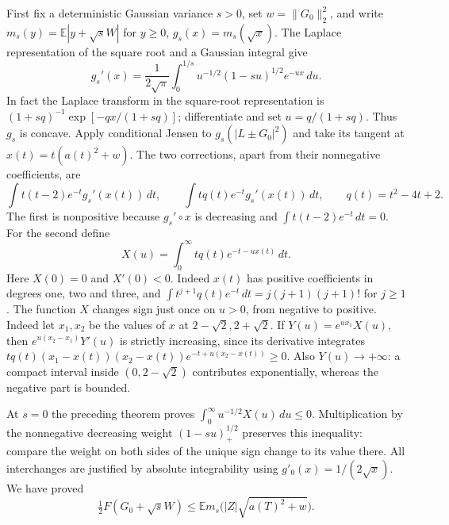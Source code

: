 \documentclass[11pt]{article}
\newcommand{\E}{\mathbb E}
\newcommand{\dd}{\,d}
\begin{document}
First fix a deterministic Gaussian variance \(s>0\), set \(w=\|G_0\|_2^2\), and write
\(m_s(y)=\E|y+\sqrt s W|\) for \(y\ge0\), \(g_s(x)=m_s(\sqrt x)\). The Laplace
representation of the square root and a Gaussian integral give
\[
 g_s'(x)=\frac1{2\sqrt\pi}\int_0^{1/s} u^{-1/2}(1-su)^{1/2} e^{-ux}\dd u.       \tag{3}
\]
In fact the Laplace transform in the square-root representation is
\((1+sq)^{-1}\exp[-qx/(1+sq)]\); differentiate and set \(u=q/(1+sq)\).
Thus \(g_s\) is concave. Apply conditional Jensen to \(g_s(|L\pm G_0|^2)\)
and take its tangent at \(x(t)=t(a(t)^2+w)\). The two corrections, apart from
their nonnegative coefficients, are
\[
 \int t(t-2)e^{-t}g_s'(x(t))\dd t,\qquad
 \int t q(t)e^{-t}g_s'(x(t))\dd t,\qquad q(t)=t^2-4t+2 .
\]
The first is nonpositive because \(g_s'\circ x\) is decreasing and
\(\int t(t-2)e^{-t}\dd t=0\). For the second define
\[
 X(u)=\int_0^\infty t q(t)e^{-t-u x(t)}\dd t.
\]
Here \(X(0)=0\) and \(X'(0)<0\). Indeed \(x(t)\) has positive coefficients in
degrees one, two and three, and
\(\int t^{j+1}q(t)e^{-t}\dd t=j(j+1)(j+1)!\) for \(j\ge1\).
The function \(X\) changes sign just once on \(u>0\), from negative to positive.
Indeed let \(x_1,x_2\) be the values of \(x\) at \(2-\sqrt2,2+\sqrt2\).
If \(Y(u)=e^{ux_1}X(u)\), then \(e^{u(x_2-x_1)}Y'(u)\) is strictly increasing,
since its derivative integrates
\(tq(t)(x_1-x(t))(x_2-x(t)) e^{-t+u(x_2-x(t))}\ge0\).
Also \(Y(u)\to+\infty\): a compact interval inside \((0,2-\sqrt2)\) contributes
exponentially, whereas the negative part is bounded.

At \(s=0\) the preceding theorem proves \(\int_0^\infty u^{-1/2}X(u)\dd u\le0\).
Multiplication by the nonnegative decreasing weight \((1-su)_+^{1/2}\) preserves
this inequality: compare the weight on both sides of the unique sign change
to its value there. All interchanges are justified by absolute integrability
using \(g'_0(x)=1/(2\sqrt x)\). We have proved
\[
 \tfrac12 F(G_0+\sqrt s W)\le \E m_s\bigl(|Z|\sqrt{a(T)^2+w}\bigr).       \tag{4}
\]
\end{document}

